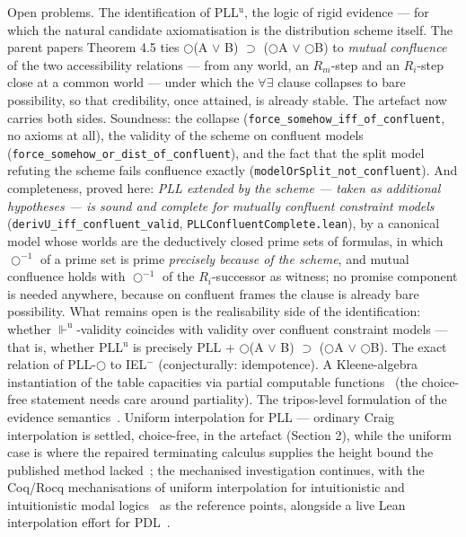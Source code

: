 Open problems. The identification of PLL\ensuremath{{}^{\mathrm{u}}},
the logic of rigid evidence --- for which the natural candidate
axiomatisation is the distribution scheme itself. The parent
paper\textquotesingle s Theorem 4.5 ties
\ensuremath{\bigcirc}(A \ensuremath{\vee} B) \ensuremath{\supset}
(\ensuremath{\bigcirc}A \ensuremath{\vee} \ensuremath{\bigcirc}B) to
\emph{mutual confluence} of the two accessibility relations --- from
any world, an \ensuremath{R_{m}}-step and an \ensuremath{R_{i}}-step
close at a common world --- under which the \ensuremath{\forall\exists}
clause collapses to bare possibility, so that credibility, once
attained, is already stable. The artefact now carries both
sides. Soundness: the collapse
(\texttt{force\_somehow\_iff\_of\_confluent}, no axioms at all), the
validity of the scheme on confluent models
(\texttt{force\_somehow\_or\_dist\_of\_confluent}), and the fact that
the split model refuting the scheme fails confluence exactly
(\texttt{modelOrSplit\_not\_confluent}). And completeness, proved
here: \emph{PLL extended by the scheme --- taken as additional
hypotheses --- is sound and complete for mutually confluent constraint
models} (\texttt{derivU\_iff\_confluent\_valid},
\texttt{PLLConfluentComplete.lean}), by a canonical model whose worlds
are the deductively closed prime sets of formulas, in which
\ensuremath{\bigcirc^{-1}} of a prime set is prime \emph{precisely
because of the scheme}, and mutual confluence holds with
\ensuremath{\bigcirc^{-1}} of the \ensuremath{R_{i}}-successor as
witness; no promise component is needed anywhere, because on confluent
frames the clause is already bare possibility.
What remains open is the realisability side of the identification:
whether \ensuremath{\Vdash^{\mathrm{u}}}-validity coincides with
validity over confluent constraint models --- that is, whether
PLL\ensuremath{{}^{\mathrm{u}}} is precisely PLL +
\ensuremath{\bigcirc}(A \ensuremath{\vee} B) \ensuremath{\supset}
(\ensuremath{\bigcirc}A \ensuremath{\vee} \ensuremath{\bigcirc}B).
The exact relation of PLL-\ensuremath{\bigcirc} to IEL\ensuremath{{}^{-}} (conjecturally: idempotence). A
Kleene-algebra instantiation of the table capacities via partial
computable functions~\cite{Kleene1945} (the choice-free statement
needs care around partiality). The tripos-level formulation of the
evidence
semantics~\cite{Hyland1982,VanOosten2008,CohenGrunfeldKirstMiquey2025}.
Uniform interpolation for PLL --- ordinary Craig interpolation is
settled, choice-free, in the artefact (Section 2), while the uniform
case is where the repaired terminating calculus supplies the height
bound the published method lacked~\cite{Pitts1992}; the mechanised
investigation continues, with the Coq/Rocq mechanisations of uniform
interpolation for intuitionistic and intuitionistic modal
logics~\cite{FereeVanDerGiessenVanGoolShillito2024,
ShillitoVanDerGiessenGoreIemhoff2023,VanDerGiessenShillito2026}
as the reference points, alongside a live Lean interpolation effort for
PDL~\cite{GattingerLean4PDL}.
